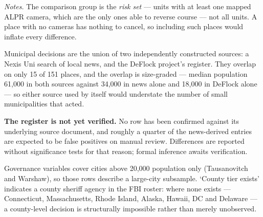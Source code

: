 \noindent\begin{minipage}{\textwidth}\footnotesize
\textit{Notes.} The comparison group is the \emph{risk set} --- units with at least one mapped ALPR camera, which are the only ones able to reverse course --- not all units. A place with no cameras has nothing to cancel, so including such places would inflate every difference.

Municipal decisions are the union of two independently constructed sources: a Nexis Uni search of local news, and the DeFlock project's register. They overlap on only 15 of 151 places, and the overlap is size-graded --- median population 61,000 in both sources against 34,000 in news alone and 18,000 in DeFlock alone --- so either source used by itself would understate the number of small municipalities that acted.

\textbf{The register is not yet verified.} No row has been confirmed against its underlying source document, and roughly a quarter of the news-derived entries are expected to be false positives on manual review. Differences are reported without significance tests for that reason; formal inference awaits verification.

Governance variables cover cities above 20,000 population only (Tausanovitch and Warshaw), so those rows describe a large-city subsample. `County tier exists' indicates a county sheriff agency in the FBI roster: where none exists --- Connecticut, Massachusetts, Rhode Island, Alaska, Hawaii, DC and Delaware --- a county-level decision is structurally impossible rather than merely unobserved.
\end{minipage}
